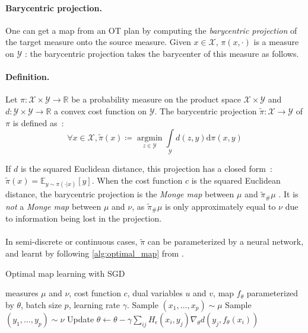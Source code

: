 \documentclass[a4paper,11pt]{article}
\newcommand{\R}{\mathbb{R}}
\newcommand{\E}{\mathbb{E}}
\newcommand{\1}{\mathbbm{1}}
\begin{document}
\paragraph{Barycentric projection.}One can get a map from an OT plan by computing the \emph{barycentric projection} of the target measure onto the source measure. Given $x \in \mathcal{X}$, $\pi(x, \cdot)$ is a measure on $\mathcal{Y}$ : the barycentric projection takes the barycenter of this measure as follows.

\paragraph{Definition.}Let $\pi : \mathcal{X} \times \mathcal{Y} \rightarrow \R$ be a probability measure on the product space $\mathcal{X} \times \mathcal{Y}$ and $d : \mathcal{Y} \times \mathcal{Y} \rightarrow \R$ a convex cost function on $\mathcal{Y}$. The barycentric projection $\widetilde{\pi} : \mathcal{X} \rightarrow \mathcal{Y}$ of $\pi$ is defined as~:
\begin{equation}
    \forall x \in \mathcal{X}, \widetilde{\pi}(x) \coloneq \mathop{\arg\min}\limits_{z \in \mathcal{Y}} \int\limits_{\mathcal{Y}} d(z, y) \mathrm{d}\pi(x, y)
\end{equation}

If $d$ is the squared Euclidean distance, this projection has a closed form~: $\widetilde{\pi}(x) = \E_{y \sim \pi(\cdot | x)}[y]$. When the cost function $c$ is the squared Euclidean distance, the barycentric projection is the \emph{Monge map} between $\mu$ and $\widetilde{\pi}_{\#}\mu$ \citep{ambrosio2008gradient}. It is \emph{not} a \emph{Monge map} between $\mu$ and $\nu$, as $\widetilde{\pi}_{\#}\mu$ is only approximately equal to $\nu$ due to information being lost in the projection.

\paragraph{}In semi-discrete or continuous cases, $\widetilde{\pi}$ can be parameterized by a neural network, and learnt by following \cref{alg:optimal_map} from \citet{seguy2018largescaleoptimaltransportmapping}.

\begin{algorithm}[H]
    \caption{Optimal map learning with SGD}
    \label{alg:optimal_map}
    \begin{algorithmic}
        \Require measures $\mu$ and $\nu$, cost function $c$, dual variables $u$ and $v$, map $f_{\theta}$ parameterized by $\theta$, batch size $p$, learning rate $\gamma$.
            \State Sample $(x_1, \ldots, x_p) \sim \mu$
            \State Sample $(y_1, \ldots, y_p) \sim \nu$
            \State Update $\theta \leftarrow \theta - \gamma \sum\limits_{ij} H_{\epsilon}(x_i, y_j) \nabla_{\theta} d(y_j, f_{\theta}(x_i))$
        \EndWhile
    \end{algorithmic}
\end{algorithm}
\end{document}
